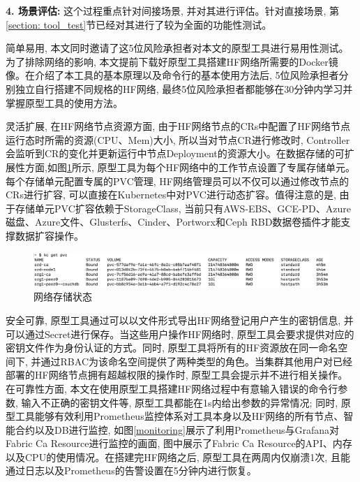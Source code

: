 \textbf{4. 场景评估: }这个过程重点针对间接场景, 并对其进行评估。针对直接场景, 第\ref{section: tool_test}节已经对其进行了较为全面的功能性测试。

简单易用, 本文同时邀请了这5位风险承担者对本文的原型工具进行易用性测试。为了排除网络的影响,
本文提前下载好原型工具搭建HF网络所需要的Docker镜像。在介绍了本工具的基本原理以及命令行的基本使用方法后, 5位风险承担者分别独立自行搭建不同规格的HF网络, 最终5位风险承担者都能够在30分钟内学习并掌握原型工具的使用方法。

灵活扩展, 在HF网络节点资源方面, 由于HF网络节点的CRs中配置了HF网络节点运行态时所需的资源(CPU、Mem)大小, 所以当对节点CR进行修改时, Controller会监听到CR的变化并更新运行中节点Deployment的资源大小。在数据存储的可扩展性方面,如图\ref{db}所示, 原型工具为每个HF网络中的工作节点设置了专属存储单元。每个存储单元配置专属的PVC管理, HF网络管理员可以不仅可以通过修改节点的CRs进行扩容, 可以直接在Kubernetes中对PVC进行动态扩容。值得注意的是, 由于存储单元PVC扩容依赖于StorageClass, 当前只有AWS-EBS、GCE-PD、Azure磁盘、Azure文件、Glusterfs、Cinder、Portworx和Ceph RBD数据卷插件才能支撑数据扩容操作。

\begin{figure}[h] %
    \centering %
    \includegraphics[width=1.0\textwidth]{FIGs/chapter5/db.png} %
    \caption{网络存储状态} %
    \label{db} %
\end{figure}%

安全可靠, 原型工具通过可以以文件形式导出HF网络登记用户产生的密钥信息, 并可以通过Secret进行保存。当这些用户操作HF网络时, 原型工具会要求提供对应的密钥文件作为身份认证的方式。同时, 原型工具将所有的HF资源放在同一命名空间下, 并通过RBAC为该命名空间提供了两种类型的角色。当集群其他用户对已经部署的HF网络节点拥有超越权限的操作时, 原型工具会提示并不进行相关操作。在可靠性方面, 本文在使用原型工具搭建HF网络过程中有意输入错误的命令行参数, 输入不正确的密钥文件等, 原型工具都能在1s内给出参数的异常情况; 同时, 原型工具能够有效利用Prometheus监控体系对工具本身以及HF网络的所有节点、智能合约以及DB进行监控, 如图\ref{monitoring}展示了利用Prometheus与Grafana对Fabric Ca Resource进行监控的画面, 图中展示了Fabric Ca Resource的API、内存以及CPU的使用情况。在搭建完HF网络之后, 原型工具在两周内仅崩溃1次, 且能通过日志以及Prometheus的告警设置在5分钟内进行恢复。

